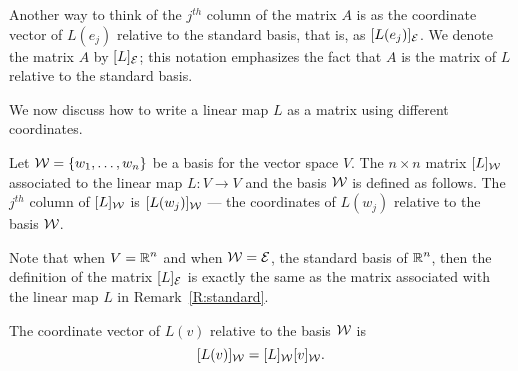 \documentclass{ximera}
\begin{document}
\begin{remark} \label{R:standard} {\rm
Another way to think of the $j^{th}$ column of the matrix $A$
is as the coordinate vector of $L(e_j)$ relative to the
standard basis, that is, as $[L(e_j)]_{\cal E}$.  We denote the
matrix $A$ by $[L]_{\cal E}$; this notation emphasizes the fact
that $A$ is the matrix of $L$ relative to the standard basis.}
\end{remark}


We now discuss how to write a linear map $L$ as a matrix using
different coordinates.
\begin{definition} \label{D:matrixincoord}
Let ${\cal W} = \{w_1,\ldots,w_n\}$ be a basis for the vector
space $V$. The $n\times n$ matrix $[L]_{\cal W}$ associated to
the linear map $L:V\to V$ and the basis ${\cal W}$ is defined
as follows.  The $j^{th}$ column of $[L]_{\cal W}$ is
$[L(w_j)]_{\cal W}$ --- the coordinates of $L(w_j)$ relative
to the basis ${\cal W}$.
\end{definition} 

Note that when $V=\mbox{$\Bbb{R}$}^n$ and when ${\cal W} = {\cal E}$, the
standard basis of $\mbox{$\Bbb{R}$}^n$, then the definition of the matrix
$[L]_{\cal E}$ is exactly the same as the matrix associated
with the linear map $L$ in Remark~\ref{R:standard}.

\begin{lemma}
The coordinate vector of $L(v)$ relative to the basis ${\cal W}$ is
\begin{equation} \label{e:matrixofL}
[L(v)]_{\cal W} = [L]_{\cal W} [v]_{\cal W}.
\end{equation}
\end{lemma}  
\end{document}
